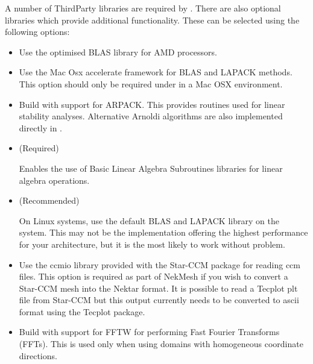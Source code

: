 A number of ThirdParty libraries are required by \nekpp. There are
also optional libraries which provide additional functionality. These
can be selected using the following options:
\begin{itemize}
    \item {}

    Use the optimised BLAS library for AMD processors.

    \item {}

    Use the Mac Osx accelerate framework for BLAS and LAPACK
    methods. This option should only be required under in a Mac OSX
    environment.

    \item {}

    Build \nekpp with support for ARPACK. This provides routines used for
    linear stability analyses. Alternative Arnoldi algorithms are also
    implemented directly in \nekpp.

    \item {} (Required)

    Enables the use of Basic Linear Algebra Subroutines libraries for linear
    algebra operations.

    \item {} (Recommended)

    On Linux systems, use the default BLAS and LAPACK library on the system.
    This may not be the implementation offering the highest performance for your
    architecture, but it is the most likely to work without problem.

    \item {}

    Use the ccmio library provided with the Star-CCM package for
    reading ccm files. This option is required as part of NekMesh
    if you wish to convert a Star-CCM mesh into the Nektar format. It
    is possible to read a Tecplot plt file from Star-CCM but this
    output currently needs to be converted to ascii format using the
    Tecplot package.

    \item {}

    Build \nekpp with support for FFTW for performing Fast Fourier Transforms
    (FFTs). This is used only when using domains with homogeneous coordinate
    directions.


\end{itemize}
